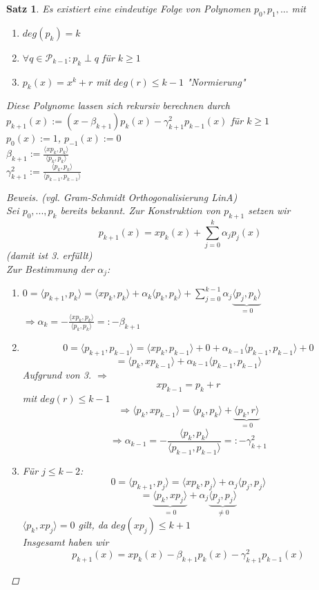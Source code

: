 \documentclass[12pt]{article}
\theoremstyle{break}
\newtheorem{theorem}{Satz}[subsection]
\begin{document}
\begin{theorem}
Es existiert eine eindeutige Folge von Polynomen $p_0, p_1, ...$ mit 
\begin{enumerate}
  \item $deg(p_k) = k$
  \item $\forall q \in \mathcal{P}_{k-1}:p_k \perp q$ für $k \geq 1$
  \item $p_k(x) = x^k + r$ mit $deg(r) \leq  k-1$ "Normierung"
\end{enumerate}
Diese Polynome lassen sich rekursiv berechnen durch \\
$ p_{k+1}(x) := (x- \beta_{k+1}) p_k(x) - \gamma_{k+1}^2 p_{k-1}(x)$ für $k \geq 1$ \\
$ p_0(x) := 1$, $p_{-1}(x) := 0$ \\
$ \beta_{k+1} := \frac{\langle xp_k, p_k \rangle}{\langle p_k, p_k \rangle}$ \\
$ \gamma_{k+1}^2 := \frac{\langle p_k, p_k \rangle}{\langle p_{k-1}, p_{k-1} \rangle}$
\begin{proof}[Beweis]
(vgl. Gram-Schmidt Orthogonalisierung LinA) \\
Sei $p_0, ..., p_k$ bereits bekannt. Zur Konstruktion von $p_{k+1}$ setzen wir
$$p_{k+1}(x) = xp_k(x) + \sum_{j=0}^{k} \alpha_j p_j(x)$$
(damit ist 3. erfüllt) \\
Zur Bestimmung der $\alpha_j$:
\begin{enumerate}
  \item $ 0 = \langle p_{k+1}, p_k \rangle = \langle xp_k, p_k \rangle + \alpha_k \langle p_k, p_k \rangle + \sum_{j=0}^{k-1} \alpha_j \underbrace{\langle p_j, p_k \rangle}_{= 0}$\\
    $\Rightarrow \alpha_k = -\frac{\langle xp_k, p_k \rangle}{\langle p_k, p_k \rangle} =: -\beta_{k+1}$
  
  \item $$0 = \langle p_{k+1}, p_{k-1} \rangle = \langle xp_k, p_{k-1} \rangle + 0 + \alpha_{k-1} \langle p_{k-1}, p_{k-1} \rangle + 0$$ 
    $$= \langle p_{k}, xp_{k-1} \rangle + \alpha_{k-1} \langle p_{k-1}, p_{k-1} \rangle$$ 
    Aufgrund von 3. $\Rightarrow$ 
    $$xp_{k-1} = p_k + r$$ mit $deg(r) \leq k-1$
    $$\Rightarrow \langle p_{k}, xp_{k-1} \rangle = \langle p_{k}, p_{k} \rangle + \underbrace{\langle p_{k}, r \rangle}_{= 0}$$ 
    $$\Rightarrow \alpha_{k-1} = - \frac{\langle p_k, p_k \rangle}{\langle p_{k-1}, p_{k-1} \rangle} =: -\gamma_{k+1}^2$$
  
  \item Für $j \leq k-2$:
    $$ 0 = \langle p_{k+1}, p_{j} \rangle = \langle xp_{k}, p_{j} \rangle + \alpha_j \langle p_{j}, p_{j} \rangle$$
    $$ = \underbrace{\langle p_{k}, xp_{j} \rangle}_{= 0} + \alpha_j \underbrace{\langle p_{j}, p_{j} \rangle}_{\neq 0}$$
    $\langle p_{k}, xp_{j} \rangle = 0$ gilt, da $deg(xp_j) \leq k+1$ \\
    Insgesamt haben wir
    $$p_{k+1}(x) = xp_k(x) - \beta_{k+1}p_k(x) - \gamma_{k+1}^2 p_{k-1}(x)$$
\end{enumerate}
\end{proof}
\end{theorem}
\end{document}
